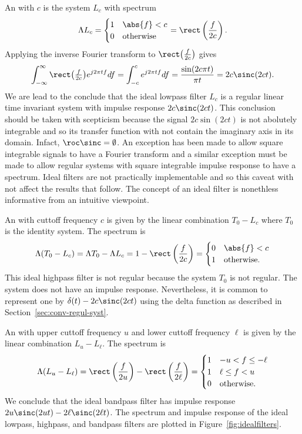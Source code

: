 An  with  $c$ is the system $L_c$ with spectrum
\[
\Lambda L_c = \begin{cases}
1 & \abs{f} < c \\
0 & \text{otherwise}
\end{cases}
= \rect\left(\frac{f}{2c}\right).
\]
Applying the inverse Fourier transform to $\rect\big(\tfrac{f}{2c}\big)$ gives
\[
\int_{-\infty}^\infty \rect\big(\tfrac{f}{2c}\big) e^{j2\pi t f} df = \int_{-c}^c e^{j2\pi t f} df = \frac{\sin(2 c\pi t)}{\pi t} = 2c\sinc(2ct).
\]
We are lead to the conclude that the ideal lowpass filter $L_c$ is a regular linear time invariant system with impulse response $2c\sinc(2ct)$.  This conclusion should be taken with scepticism because the signal $2c\sin(2ct)$ is not abolutely integrable and so its transfer function with not contain the imaginary axis in its domain.  Infact, $\roc \sinc = \emptyset$.  An exception has been made to allow square integrable signals to have a Fourier transform and a similar exception must be made to allow regular systems with square integrable impulse response to have a spectrum. Ideal filters are not practically implementable and so this caveat with not affect the results that follow. The concept of an ideal filter is nonethless informative from an intuitive viewpoint.

An  with cuttoff frequency $c$ is given by the linear combination $T_0 - L_c$ where $T_0$ is the identity system.  The spectrum is
\[
\Lambda(T_0 - L_c) = \Lambda T_0 - \Lambda L_c  = 1 - \rect\left(\frac{f}{2c}\right) = \begin{cases}
0 &  \abs{f} < c \\
1 & \text{otherwise}.
\end{cases}
\]
This ideal highpass filter is not regular because the system $T_0$ is not regular.  The system does not have an impulse response.  Nevertheless, it is common to represent one by $\delta(t) - 2c\sinc(2ct)$ using the delta function as described in Section~\ref{sec:conv-regul-syst}.

An  with upper cuttoff frequency $u$ and lower cuttoff frequency $\ell$ is given by the linear combination $L_u - L_\ell$.  The spectrum is
\[
\Lambda(L_u - L_\ell) = \rect\left(\frac{f}{2u}\right) - \rect\left(\frac{f}{2\ell}\right) = \begin{cases}
1 &  -u < f \leq -\ell \\
1 &  \ell \leq f < u \\
0 & \text{otherwise}.
\end{cases}
\]
We conclude that the ideal bandpass filter has impulse response $2u\sinc(2ut) - 2\ell\sinc(2\ell t)$.  The spectrum and impulse response of the ideal lowpass, highpass, and bandpass filters are plotted in Figure~\ref{fig:idealfilters}.


